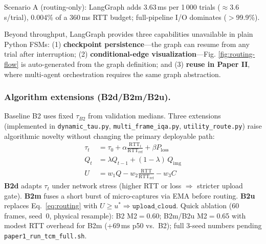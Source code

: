 \begin{table}[t]
\centering
\caption{Routing framework benchmark: 1\,000 trials $\times$ 5 repeats.}
\label{tab:fsm-benchmark}
\small
{}
\vskip 2mm
\scriptsize
\raggedright
Scenario A (routing-only): LangGraph adds 3.63\,ms per 1\,000 trials ($\approx$3.6\,\textmu s/trial), 0.004\% of a 360\,ms RTT budget; full-pipeline I/O dominates ($>$99.9\%).
\end{table}

Beyond throughput, LangGraph provides three capabilities unavailable in plain Python FSMs: (1) \textbf{checkpoint persistence}---the graph can resume from any trial after interruption; (2) \textbf{conditional-edge visualization}---Fig. \ref{fig:routing-flow} is auto-generated from the graph definition; and (3) \textbf{reuse in Paper II}, where multi-agent orchestration requires the same graph abstraction.

\subsubsection{Algorithm extensions (B2d/B2m/B2u).}
Baseline B2 uses fixed $\tau_{B2}$ from validation medians. Three extensions (implemented in \texttt{dynamic\_tau.py}, \texttt{multi\_frame\_iqa.py}, \texttt{utility\_route.py}) raise algorithmic novelty without changing the primary deployable path:
\begin{align}
\tau_t &= \tau_0 + \alpha \tfrac{\mathrm{RTT}_t}{\mathrm{RTT}_{\mathrm{ref}}} + \beta P_{\mathrm{loss}} \label{eq:dynamic-tau}\\
Q_t &= \lambda Q_{t-1} + (1-\lambda)\, Q_{\mathrm{img}} \label{eq:ema-iqa}\\
U &= w_1 Q - w_2 \tfrac{\mathrm{RTT}}{\mathrm{RTT}_{\mathrm{ref}}} - w_3 C \label{eq:utility}
\end{align}
\textbf{B2d} adapts $\tau_t$ under network stress (higher RTT or loss $\Rightarrow$ stricter upload gate).
\textbf{B2m} fuses a short burst of micro-captures via EMA before routing.
\textbf{B2u} replaces Eq.~\ref{eq:routing} with $U\geq u^\ast \Rightarrow \texttt{upload\_cloud}$.
Quick ablation (60 frames, seed~0, physical resample): B2 M2$=$0.60; B2m/B2u M2$=$0.65 with modest RTT overhead for B2m (+69\,ms p50 vs.\ B2); full 3-seed numbers pending \texttt{paper1\_run\_tcm\_full.sh}.


